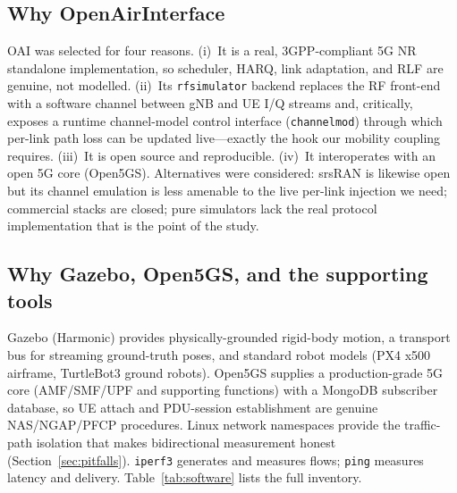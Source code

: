 \documentclass[10pt, conference]{IEEEtran}
\begin{document}
\subsection{Why OpenAirInterface}
OAI was selected for four reasons. (i)~It is a real, 3GPP-compliant 5G NR standalone implementation, so scheduler, HARQ, link adaptation, and RLF are genuine, not modelled. (ii)~Its \texttt{rfsimulator} backend replaces the RF front-end with a software channel between gNB and UE I/Q streams and, critically, exposes a runtime channel-model control interface (\texttt{channelmod}) through which per-link path loss can be updated live---exactly the hook our mobility coupling requires. (iii)~It is open source and reproducible. (iv)~It interoperates with an open 5G core (Open5GS). Alternatives were considered: srsRAN is likewise open but its channel emulation is less amenable to the live per-link injection we need; commercial stacks are closed; pure simulators lack the real protocol implementation that is the point of the study.

\subsection{Why Gazebo, Open5GS, and the supporting tools}
Gazebo (Harmonic) provides physically-grounded rigid-body motion, a transport bus for streaming ground-truth poses, and standard robot models (PX4 x500 airframe, TurtleBot3 ground robots). Open5GS supplies a production-grade 5G core (AMF/SMF/UPF and supporting functions) with a MongoDB subscriber database, so UE attach and PDU-session establishment are genuine NAS/NGAP/PFCP procedures. Linux network namespaces provide the traffic-path isolation that makes bidirectional measurement honest (Section~\ref{sec:pitfalls}). \texttt{iperf3} generates and measures flows; \texttt{ping} measures latency and delivery. Table~\ref{tab:software} lists the full inventory.
\end{document}
